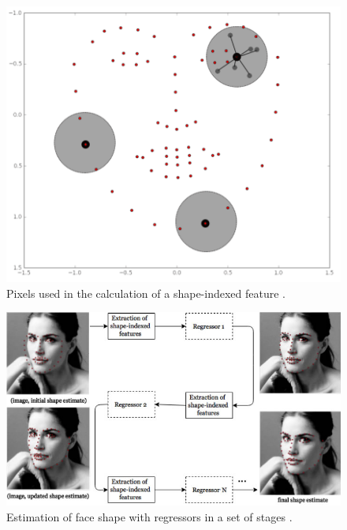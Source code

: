 \begin{figure}[h]
    \centering
    \includegraphics[width=0.5\linewidth]{figures/shape-indexed.png}
    \caption{Pixels used in the calculation of a shape-indexed feature \parencite{maris2015}.}
    \label{fig:shape-indexed}
\end{figure}

\begin{figure}[h]
    \centering
    \includegraphics[width=1.0\linewidth]{figures/cascade-explanation.fw.png}
    \caption{Estimation of face shape with regressors in a set of stages \parencite{maris2015}.}
    \label{fig:regressor-steps}
\end{figure}


